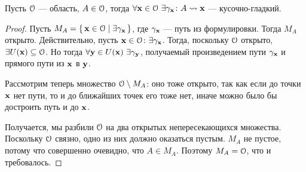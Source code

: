\begin{lemma}
    Пусть $\mathcal{O}$ --- область, $A \in \mathcal{O}$, тогда $\forall \mathbf{x} \in \mathcal{O}~ \exists
    \gamma_{\mathbf{x}} \colon A \rightsquigarrow \mathbf{x}$ --- кусочно-гладкий.
\end{lemma}
\begin{proof}
    Пусть $M_A = \{\, \mathbf{x} \in \mathcal{O} \mid \exists \gamma_{\mathbf{x}} \,\}$, где $\gamma_{\mathbf{x}}$
    --- путь из формулировки. Тогда $M_A$ открыто. Действительно, пусть
    $\mathbf{x} \in \mathcal{O}\colon \exists \gamma_{\mathbf{x}}$. Тогда, поскольку $\mathcal{O}$ открыто,
    $\exists U(\mathbf{x}) \subseteq \mathcal{O}$. Но тогда $\forall \mathbf{y} \in U(\mathbf{x})~ \exists \gamma_{\mathbf{y}}$,
    получаемый произведением пути $\gamma_{\mathbf{x}}$ и прямого пути из $\mathbf{x}$ в $\mathbf{y}$.

    Рассмотрим теперь множество $\mathcal{O} \setminus M_A$: оно тоже открыто, так как
    если до точки $\mathbf{x}$ нет пути, то и до ближайших точек его тоже нет, иначе можно
    было бы достроить путь и до $\mathbf{x}$.

    Получается, мы разбили $\mathcal{O}$ на два открытых непересекающихся множества.
    Поскольку $\mathcal{O}$ связно, одно из них должно оказаться пустым. $M_A$ не пустое,
    потому что совершенно очевидно, что $A \in M_A$. Поэтому $M_A = \mathcal{O}$,
    что и требовалось.
\end{proof}

